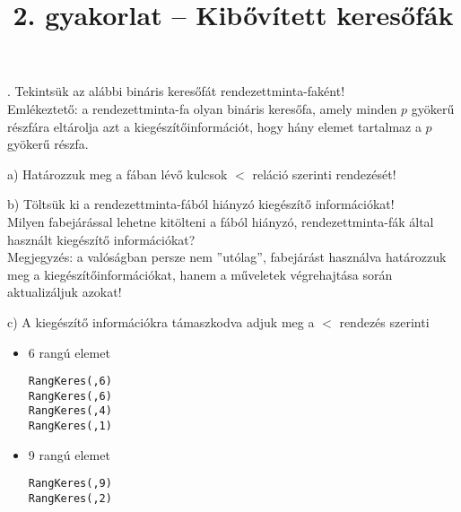 \documentclass[12pt]{article}
\date{}
\title{2. gyakorlat -- Kibővített keresőfák}
\begin{document}
\maketitle

. Tekintsük az alábbi bináris keresőfát rendezettminta-faként!\\
Emlékeztető: a rendezettminta-fa olyan bináris keresőfa, amely minden $p$ gyökerű részfára eltárolja azt a kiegészítőinformációt, hogy hány elemet tartalmaz a $p$ gyökerű részfa.

\begin{figure}[!h]
\centering
\end{figure}

\noindent a) Határozzuk meg a fában lévő kulcsok $<$ reláció szerinti rendezését!

\noindent b) Töltsük ki a rendezettminta-fából hiányzó kiegészítő információkat!\\
Milyen fabejárással lehetne kitölteni a fából hiányzó, rendezettminta-fák által használt kiegészítő információkat? \\
Megjegyzés: a valóságban persze nem ''utólag'', fabejárást használva határozzuk meg a kiegészítőinformációkat, hanem a műveletek végrehajtása során aktualizáljuk azokat!

\noindent c) A kiegészítő információkra támaszkodva adjuk meg a $<$ rendezés szerinti

\begin{itemize}
\item 6 rangú elemet
\begin{alltt}
RangKeres(\mercury, 6)
RangKeres(\mars, 6)
RangKeres(\aquarius, 4)
RangKeres(\saturn, 1)
\end{alltt}

\item 9 rangú elemet
\begin{alltt}
RangKeres(\mercury, 9)
RangKeres(\pisces, 2)
\end{alltt}
\end{itemize}
\end{document}
